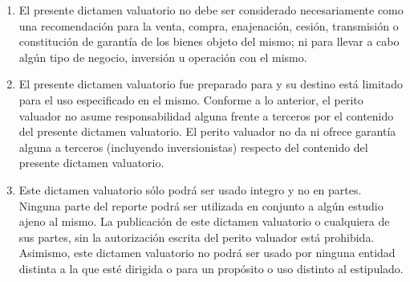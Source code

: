 \begin{enumerate}[\indent a)]
\item El presente dictamen valuatorio no debe ser considerado necesariamente como una recomendación para la venta, compra, enajenación, cesión, transmisión o constitución de garantía de los bienes objeto del mismo; ni para llevar a cabo algún tipo de negocio, inversión u operación con el mismo.

\item El presente dictamen valuatorio fue preparado para \textcolor{principal}{\empresaSolicitante}{} y su destino está limitado para el uso especificado  en el mismo. Conforme a lo anterior, el perito valuador no asume responsabilidad alguna frente a terceros por el contenido del presente dictamen valuatorio. El perito valuador no da ni ofrece garantía alguna a terceros (incluyendo inversionistas) respecto del contenido del presente dictamen valuatorio.

\item Este dictamen valuatorio sólo podrá ser usado integro y no en partes. Ninguna parte del reporte podrá ser utilizada en conjunto a algún estudio ajeno al mismo. La publicación de este dictamen valuatorio o cualquiera de sus partes, sin la autorización escrita del perito valuador está prohibida. Asimismo, este dictamen valuatorio no podrá ser usado por ninguna entidad distinta a la que esté dirigida o para un propósito o uso distinto al estipulado.

\end{enumerate}